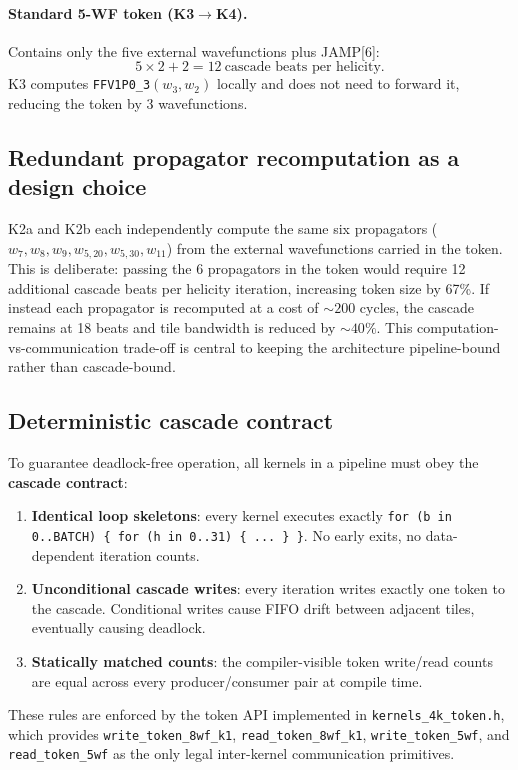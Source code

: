 \paragraph{Standard 5-WF token (K3$\to$K4).}
Contains only the five external wavefunctions plus JAMP[6]:
\begin{equation}
  5 \times 2 + 2 = 12\ \text{cascade beats per helicity}.
  \label{eq:standard_token}
\end{equation}
K3 computes \texttt{FFV1P0\_3}$(w_3, w_2)$ locally and does not need to
forward it, reducing the token by 3 wavefunctions.

\subsection{Redundant propagator recomputation as a design choice}
\label{sec:redundant_recompute}

K2a and K2b each independently compute the same six propagators
($w_7, w_8, w_9, w_{5,20}, w_{5,30}, w_{11}$) from the external wavefunctions
carried in the token.  This is deliberate: passing the 6 propagators in the
token would require 12 additional cascade beats per helicity iteration,
increasing token size by 67\%.  If instead each propagator is recomputed
at a cost of ${\sim}200$ cycles, the cascade remains at 18 beats and tile
bandwidth is reduced by ${\sim}40\%$.  This computation-vs-communication
trade-off is central to keeping the architecture pipeline-bound rather than
cascade-bound.

\subsection{Deterministic cascade contract}\label{sec:contract}

To guarantee deadlock-free operation, all kernels in a pipeline must obey the
\textbf{cascade contract}:
\begin{enumerate}
  \item \textbf{Identical loop skeletons}: every kernel executes exactly
    \texttt{for (b in 0..BATCH) \{ for (h in 0..31) \{ ... \} \}}.  No early
    exits, no data-dependent iteration counts.
  \item \textbf{Unconditional cascade writes}: every iteration writes exactly
    one token to the cascade.  Conditional writes cause FIFO drift between
    adjacent tiles, eventually causing deadlock.
  \item \textbf{Statically matched counts}: the compiler-visible token
    write/read counts are equal across every producer/consumer pair at compile
    time.
\end{enumerate}
These rules are enforced by the token API implemented in
\texttt{kernels\_4k\_token.h}, which provides \texttt{write\_token\_8wf\_k1},
\texttt{read\_token\_8wf\_k1}, \texttt{write\_token\_5wf}, and
\texttt{read\_token\_5wf} as the only legal inter-kernel communication
primitives.

